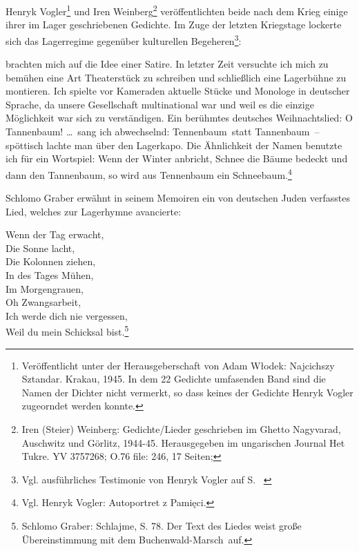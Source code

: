 Henryk Vogler\footnote{Veröffentlicht unter der Herausgeberschaft von Adam W\l odek: Najcichszy Sztandar. Krakau, 1945. In dem 22 Gedichte umfasenden Band sind die Namen der Dichter nicht vermerkt, so dass keines der Gedichte Henryk Vogler zugeorndet werden konnte.} und Iren Weinberg\footnote{Iren (Steier) Weinberg: Gedichte/Lieder geschrieben im Ghetto Nagyvarad, Auschwitz und Görlitz, 1944-45. Herausgegeben im ungarischen Journal \glqq Het Tukre\grqq. YV 3757268; O.76 file: 246, 17 Seiten;} veröffentlichten beide nach dem Krieg einige ihrer im Lager geschriebenen Gedichte. Im Zuge der letzten Kriegstage lockerte sich das Lagerregime gegenüber kulturellen Begeheren\footnote{Vgl. ausführliches Testimonie von Henryk Vogler auf S. ~\pageref{vogler}}:
\begin{leftbar}
 brachten mich auf die Idee einer Satire. In letzter Zeit versuchte ich mich zu bemühen eine Art Theaterstück zu schreiben und schließlich eine Lagerbühne zu montieren. Ich spielte vor Kameraden aktuelle Stücke und Monologe in deutscher Sprache, da unsere Gesellschaft multinational war und weil es die einzige Möglichkeit war sich zu verständigen. Ein berühmtes deutsches Weihnachtslied: \glqq O Tannenbaum! \dots\grqq~sang ich abwechselnd: \glqq Tennenbaum\grqq~statt \glqq Tannenbaum\grqq~--spöttisch lachte man über den Lagerkapo. Die Ähnlichkeit der Namen benutzte ich für ein Wortspiel: Wenn der Winter anbricht, Schnee die Bäume bedeckt und dann den Tannenbaum, so wird aus Tennenbaum ein Schneebaum.\footnote{Vgl. Henryk Vogler: Autoportret z Pamięci.}
\end{leftbar}

Schlomo Graber erwähnt in seinem Memoiren ein von deutschen Juden verfasstes Lied, welches zur Lagerhymne avancierte:
\begin{leftbar}
Wenn der Tag erwacht,\\
Die Sonne lacht,\\
Die Kolonnen ziehen,\\
In des Tages Mühen,\\
Im Morgengrauen,\\
Oh Zwangsarbeit,\\
Ich werde dich nie vergessen,\\
Weil du mein Schicksal bist.\footnote{Schlomo Graber: Schlajme, S. 78. Der Text des Liedes weist große Übereinstimmung mit dem \glqq Buchenwald-Marsch\grqq~auf.}
\end{leftbar}


